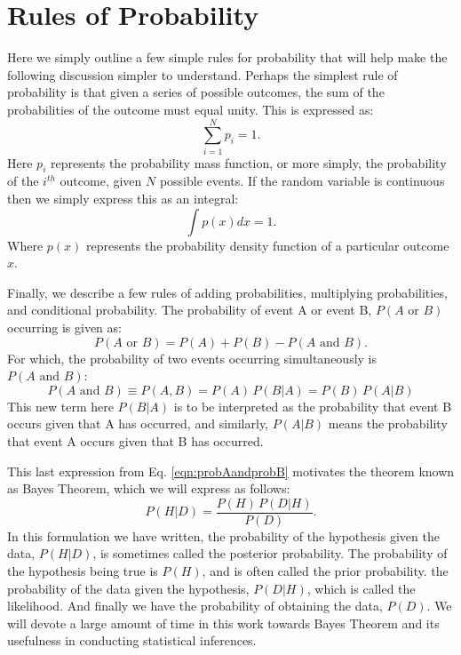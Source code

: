 \section{Rules of Probability}
Here we simply outline a few simple rules for probability that will help make the following discussion simpler to understand. Perhaps the simplest rule of probability is that given a series of possible outcomes, the sum of the probabilities of the outcome must equal unity. This is expressed as:
\begin{equation}\label{eqn:probsumdiscrete}
    \sum_{i=1}^{N} p_i = 1.
\end{equation}
Here $p_i$ represents the probability mass function, or more simply, the probability of the \textit{$i^{th}$} outcome, given $N$ possible events. If the random variable is continuous then we simply express this as an integral:
\begin{equation}\label{eqn:probsumcontinuous}
    \int p \left( x \right) dx = 1.
\end{equation}
Where $p(x)$ represents the probability density function of a particular outcome $x$.

Finally, we describe a few rules of adding probabilities, multiplying probabilities, and conditional probability. The probability of event A or event B, $P(A\textrm{ or }B)$ occurring is given as:
\begin{equation}
    P\left(A\textrm{ or }B\right) = P(A) + P(B) - P(A\textrm{ and }B).
\end{equation}
For which, the probability of two events occurring simultaneously is $P(A \textrm{ and } B)$:
\begin{equation}\label{eqn:probAandprobB}
    P\left(A\textrm{ and }B\right) \equiv P(A,B) = P(A) \, P(B|A) = P(B) \, P(A|B)
\end{equation}
This new term here $P(B|A)$ is to be interpreted as the probability that event B occurs given that A has occurred, and similarly, $P(A|B)$ means the probability that event A occurs given that B has occurred.

This last expression from Eq. \ref{eqn:probAandprobB} motivates the theorem known as Bayes Theorem, which we will express as follows:
\begin{equation} \label{eqn:BayesTheorem_basic}
     P(H|D) = \frac{P(H) \, P(D|H)}{P(D)}.
\end{equation}
In this formulation we have written, the probability of the hypothesis given the data, $P(H|D)$, is sometimes called the posterior probability. The probability of the hypothesis being true is $P(H)$, and is often called the prior probability. the probability of the data given the hypothesis, $P(D|H)$, which is called the likelihood. And finally we have the probability of obtaining the data, $P(D)$. We will devote a large amount of time in this work towards Bayes Theorem and its usefulness in conducting statistical inferences. 


